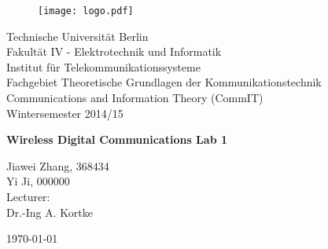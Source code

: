 


\newcommand{\trdate}{\today}

\begin{figure}
\begin{flushright}%
\texttt{[image: logo.pdf]}
\end{flushright}
\end{figure}



\noindent
{\small
Technische Universit\"at Berlin\\
Fakult\"at IV - Elektrotechnik und Informatik\\
Institut f\"ur Telekommunikationssysteme\\
Fachgebiet Theoretische Grundlagen der Kommunikationstechnik\\
Communications and Information Theory (CommIT)\\
Wintersemester 2014/15\\
}
\vspace{2cm}




\thispagestyle{empty}
\begin{center}
{\Huge\bf Wireless Digital Communications Lab 1}\\
\vspace{1cm}
\vspace{2cm}

Jiawei Zhang, 368434\\
Yi Ji, 000000\\

\vspace{2cm}
Lecturer: \\ Dr.-Ing A. Kortke

\vspace{2cm}
\today
\end{center}
\thispagestyle{empty}
\newpage
\setcounter{page}{1} %












\clearpage
